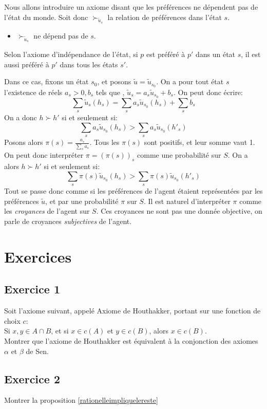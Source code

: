  Nous allons introduire un axiome disant que les préférences ne
dépendent pas de l'état du monde. Soit donc $\succ_{\tilde u_s}$
la relation de préférences dans l'état $s$.
\begin{itemize}
\item[\bf Indépendance de l'état] $\succ_{\tilde u_s}$ ne dépend
pas de $s$.
\end{itemize}
Selon l'axiome d'indépendance de l'état, si $p$ est préféré à $p'$
dans un état $s$, il est aussi préféré à $p'$ dans tous les états
$s'$.

Dans ce cas, fixons un état $s_0$, et posons $\tilde u = \tilde
u_{s_0}$. On a pour tout état $s$ l'existence de réels
$a_{s}>0,b_s$ tels que , $\tilde u_{s}=
a_{s}\tilde u_{s_0} +b_{s}$. On peut donc écrire:%
$$
\sum_{s} \tilde u_s(h_s) = \sum_s a_s \tilde u_{s_0}(h_s) +\sum_s b_s
$$
 On a donc $h\succ h'$ si et seulement si:
$$
\sum_s a_s \tilde u_{s_0}(h_s) > \sum_s a_s \tilde u_{s_0}(h'_s)
$$
Posons alors $\pi(s) = \frac{a_s}{\sum_s a_s}$. Tous les $\pi(s)$
sont positifs, et leur somme vaut 1. On peut donc interpréter
$\pi=(\pi(s))_s$ comme une probabilité sur $S$. On a alors $h\succ
h'$ si et seulement si:
$$
\sum_s \pi(s) \tilde u_{s_0}(h_s) > \sum_s \pi(s) \tilde
u_{s_0}(h'_s)
$$
Tout se passe donc comme si les préférences de l'agent étaient
représentées par les préférences $\tilde u$, et par une
probabilité $\pi$ sur $S$. Il est naturel d'interpréter $\pi$
comme les {\em croyances} de l'agent sur $S$. Ces croyances ne
sont pas une donnée objective, on parle de croyances {\em
subjectives} de l'agent.
%
\section{Exercices}
\subsection{Exercice 1}
Soit l'axiome suivant, appelé Axiome de Houthakker, portant sur
une fonction de choix $c$:\\
Si $x,y\in A\cap B$, et si $x\in c(A)$ et $y\in c(B)$, alors $x\in
c(B)$.\\
Montrer que l'axiome de Houthakker est équivalent à la conjonction
des axiomes $\alpha$ et $\beta$ de Sen.
\subsection{Exercice 2}
Montrer la proposition \ref{rationelleimpliquelereste} %
